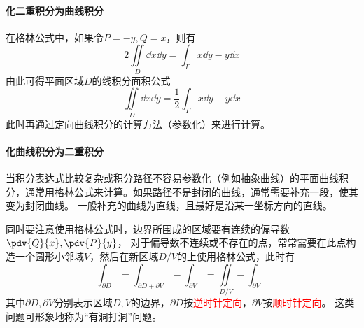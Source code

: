 \paragraph{化二重积分为曲线积分}
在格林公式中，如果令$P=-y,Q=x$，则有
\[ 2\iint\limits_D \dd{x}\dd{y} = \int_\Gamma x\dd{y} - y\dd{x} \]
由此可得平面区域$D$的线积分面积公式
\[ \iint\limits_D \dd{x}\dd{y} = \frac{1}{2} \int_\Gamma x\dd{y}-y\dd{x} \]
此时再通过定向曲线积分的计算方法（参数化）来进行计算。

\paragraph{化曲线积分为二重积分}
当积分表达式比较复杂或积分路径不容易参数化（例如抽象曲线）的平面曲线积分，通常用格林公式来计算。如果路径不是封闭的曲线，通常需要补充一段，使其变为封闭曲线。
一般补充的曲线为直线，且最好是沿某一坐标方向的直线。

同时要注意使用格林公式时，边界所围成的区域要有连续的偏导数$\pdv{Q}{x},\pdv{P}{y}$，
对于偏导数不连续或不存在的点，常常需要在此点构造一个圆形小邻域$V$，然后在新区域$D/V$的上使用格林公式，此时有
\begin{equation}
    \int_{\partial D} = \int_{\partial D+\partial V} - \int_{\partial V} = \iint\limits_{D/V} - \int_{\partial V}
\end{equation}
其中$\partial D,\partial V$分别表示区域$D,V$的边界，$\partial D$按\textcolor{red}{逆时针定向}，$\partial V$按\textcolor{red}{顺时针定向}。
这类问题可形象地称为“有洞打洞”问题。

